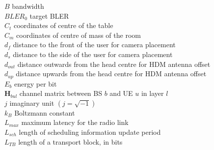 $B$ \mytab bandwidth \\
$BLER_0$ \mytab target \acs{BLER} \\



$C_t$ \mytab coordinates of centre of the table \\
$C_m$ \mytab coordinates of centre of mass of the room \\

$d_f$ \mytab distance to the front of the user for camera placement \\
$d_s$ \mytab distance to the side of the user for camera placement \\
$d_{out}$ \mytab distance outwards from the head centre for \acs{HDM} antenna offset\\
$d_{up}$ \mytab distance upwards from the head centre for \acs{HDM} antenna offset\\

$E_b$ \mytab energy per bit \\



$\bm{H}_{bul}$ \mytab channel matrix between BS $b$ and UE $u$ in layer $l$\\

$j$ \mytab imaginary unit $\left(j = \sqrt{-1}\right)$\\


$k_B$ \mytab Boltzmann constant\\

$L_{max}$ \mytab maximum latency for the radio link \\
$L_{sch}$  \mytab length of scheduling information update period \\
$L_{TB}$ \mytab length of a transport block, in bits \\



